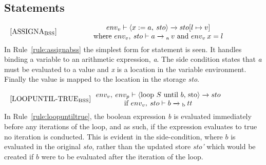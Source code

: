 \subsection*{Statements}
\begin{equation}\label{rule:assignabss}
\begin{minipage}{.2\linewidth}
$[\text{ASSIGNA}_\text{BSS}]$
\end{minipage}
\begin{minipage}{.8\linewidth}
\centering
$env_v \vdash \langle x := a, \: sto \rangle \xrightarrow{} sto[l \mapsto v]$
\\
where $env_v, \: sto \vdash a \xrightarrow{}\textsubscript{a} \: v$ and $env_v \: x = l$
\end{minipage}
\end{equation}
In Rule~\ref{rule:assignabss} the simplest form for statement is seen. It handles binding a variable to an arithmetic expression, \textit{a}. The side condition states that \textit{a} must be evaluated to a value and \textit{x} is a location in the variable environment. Finally the value is mapped to the location in the storage \textit{sto}.


\begin{equation}\label{rule:loopuntiltrue}
\begin{minipage}{.2\linewidth}
$[\text{LOOPUNTIL-TRUE}_\text{BSS}]$
\end{minipage}
\begin{minipage}{.8\linewidth}
\centering
$env_v, \: env_p \vdash \langle $loop $S$ until $b$, sto$\rangle \xrightarrow{} sto$ \\
if $env_v, \: sto \vdash b \xrightarrow{}\textsubscript{b} \: tt$ 
\end{minipage}
\end{equation}
In Rule~\ref{rule:loopuntiltrue}, the boolean expression \textit{b} is evaluated immediately before any iterations of the loop, and as such, if the expression evaluates to true no iteration is conducted. This is evident in the side-condition, where $b$ is evaluated in the original \textit{sto}, rather than the updated store \textit{sto'} which would be created if $b$ were to be evaluated after the iteration of the loop.

